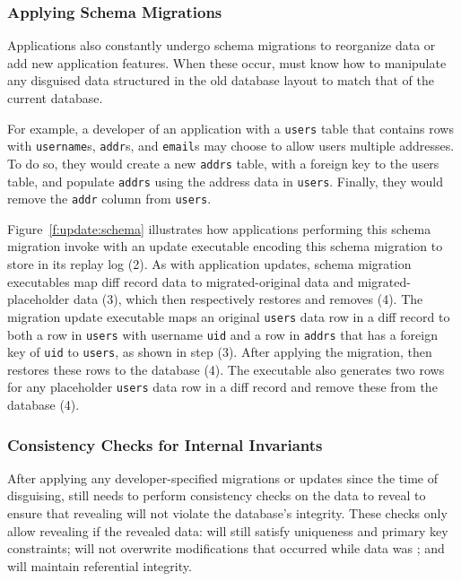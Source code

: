 \subsubsection{Applying Schema Migrations}
Applications also constantly undergo schema migrations to reorganize data or add
new application features. When these occur, \sys must know how to manipulate any
disguised data structured in the old database layout to match that of the
current database.

%
For example, a developer of an application with a \texttt{users} table that
contains rows with \texttt{username}s, \texttt{addr}s, and \texttt{email}s may
choose to allow users multiple addresses. To do so, they would create a new
\texttt{addrs} table, with a foreign key to the users table, and populate
\texttt{addrs} using the address data in \texttt{users}.  Finally, they would
remove the \texttt{addr} column from \texttt{users}.
%

%
Figure~\ref{f:update:schema} illustrates how applications performing this schema
migration invoke \sys with an update executable encoding this schema
migration to store in its replay log (2).
%
As with application updates, schema migration executables map diff record data
to migrated-original data and migrated-placeholder data (3), which \sys then
respectively restores and removes (4).
%
The migration update executable maps an original \texttt{users} data row
in a diff record to both a row in \texttt{users} with username \texttt{uid} and
a row in \texttt{addrs} that has a foreign key of \texttt{uid} to
\texttt{users}, as shown in step (3). After applying the migration, \sys then
restores these rows to the database (4).
%
The executable also generates two rows for any placeholder \texttt{users}
data row in a diff record and remove these from the database (4).
%

\subsubsection{Consistency Checks for Internal Invariants} 
After applying any developer-specified migrations or updates since the time of
disguising, \sys still needs to perform consistency checks on the data to reveal
to ensure that revealing will not violate the database's integrity.
%
These checks only allow revealing if the revealed data: \one{} will still
satisfy uniqueness and primary key constraints; \two{} will not overwrite
modifications that occurred while data was \xxed; and \three{} will maintain
referential integrity.

